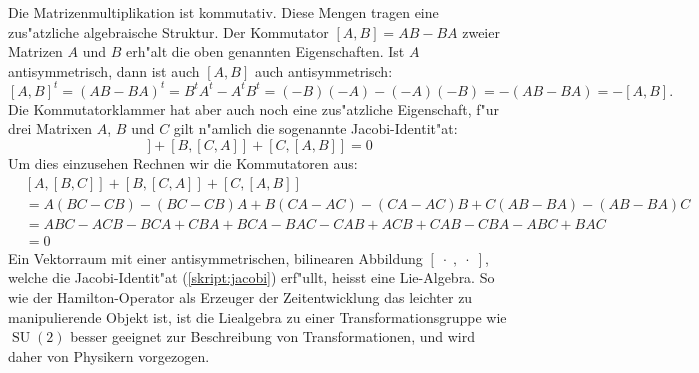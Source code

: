 Die Matrizenmultiplikation ist kommutativ.
Diese Mengen tragen eine zus"atzliche algebraische Struktur. 
Der Kommutator $[A,B]=AB-BA$ zweier Matrizen $A$ und $B$ erh"alt
die oben genannten Eigenschaften. Ist $A$ antisymmetrisch, dann
ist auch $[A,B]$ auch antisymmetrisch:
\[
[A,B]^t
=
(AB-BA)^t
=
B^tA^t-A^tB^t
=
(-B)(-A)-(-A)(-B)
=
-(AB-BA)
=
-[A,B].
\]
Die Kommutatorklammer hat aber auch noch eine zus"atzliche Eigenschaft,
f"ur drei Matrixen $A$, $B$ und $C$ gilt n"amlich die sogenannte
Jacobi-Identit"at:
\begin{equation}
[A,[B, C]]
+
[B,[C, A]]
+
[C,[A, B]]
=
0
\label{skript:jacobi}
\end{equation}
Um dies einzusehen Rechnen wir die Kommutatoren aus:
\begin{align*}
&
[A,[B, C]]
+
[B,[C, A]]
+
[C,[A, B]]
\\
&=
A(BC-CB)-(BC-CB)A
+
B(CA-AC)-(CA-AC)B
+
C(AB-BA)-(AB-BA)C
\\
&=
ABC-ACB-BCA+CBA
+
BCA-BAC-CAB+ACB
+
CAB-CBA-ABC+BAC
\\
&=0
\end{align*}
Ein Vektorraum mit einer antisymmetrischen, bilinearen Abbildung
$[\;\cdot\;,\;\cdot\;]$,
welche die Jacobi-Identit"at (\ref{skript:jacobi}) erf"ullt, heisst eine
Lie-Algebra.
So wie der Hamilton-Operator als Erzeuger der Zeitentwicklung das
leichter zu manipulierende Objekt ist, ist die Liealgebra zu einer
Transformationsgruppe wie $\operatorname{SU}(2)$ besser geeignet
zur Beschreibung von Transformationen, und wird daher von Physikern
vorgezogen.

